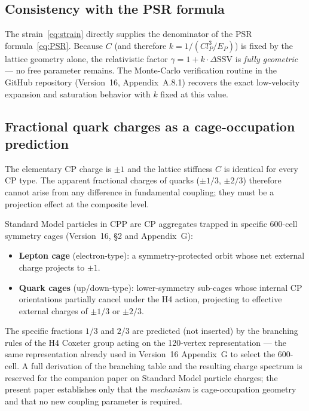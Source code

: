 \documentclass[12pt]{article}
\newcommand{\lP}{l_P}
\newcommand{\EP}{E_P}
\newcommand{\SSV}{\text{SSV}}
\begin{document}
\subsection{Consistency with the PSR formula}

The strain~\eqref{eq:strain} directly supplies the denominator of the PSR
formula~\eqref{eq:PSR}.  Because $C$ (and therefore $k = 1/(C\lP^3/\EP)$)
is fixed by the lattice geometry alone, the relativistic factor
$\gamma = 1 + k\cdot\Delta\SSV$ is \emph{fully geometric} --- no free
parameter remains.  The Monte-Carlo verification routine in the GitHub
repository (Version~16, Appendix~A.8.1) recovers the exact low-velocity
expansion and saturation behavior with $k$ fixed at this value.

\subsection{Fractional quark charges as a cage-occupation prediction}
\label{sec:cage}

The elementary CP charge is $\pm 1$ and the lattice stiffness $C$ is
identical for every CP type.  The apparent fractional charges of quarks
($\pm 1/3$, $\pm 2/3$) therefore cannot arise from any difference in
fundamental coupling; they must be a projection effect at the composite level.

Standard Model particles in CPP are CP aggregates trapped in specific
600-cell symmetry cages (Version~16, \S 2 and Appendix~G):
\begin{itemize}
  \item \textbf{Lepton cage} (electron-type): a symmetry-protected orbit
    whose net external charge projects to $\pm 1$.
  \item \textbf{Quark cages} (up/down-type): lower-symmetry sub-cages whose
    internal CP orientations partially cancel under the H4 action, projecting
    to effective external charges of $\pm 1/3$ or $\pm 2/3$.
\end{itemize}
The specific fractions $1/3$ and $2/3$ are predicted (not inserted) by the
branching rules of the H4 Coxeter group acting on the 120-vertex
representation --- the same representation already used in Version~16
Appendix~G to select the 600-cell.  A full derivation of the branching table
and the resulting charge spectrum is reserved for the companion paper on
Standard Model particle charges; the present paper establishes only that the
\emph{mechanism} is cage-occupation geometry and that no new coupling
parameter is required.
\end{document}

